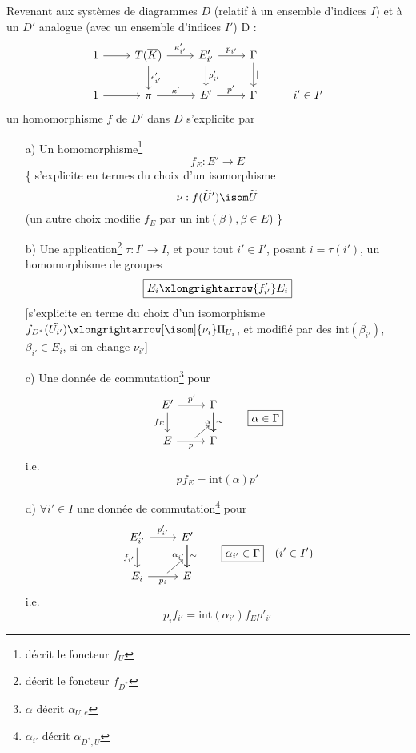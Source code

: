 Revenant aux systèmes de diagrammes $D$ (relatif à un ensemble d'indices $I$) et à un $D'$ analogue (avec un ensemble d'indices $I'$) D :
\[\begin{tikzcd}
	1 & {T(\overline{K})} & {E'_{i'}} & \Gamma \\
	1 & \pi & E' & \Gamma & i' \in I'
	\arrow[from=1-1, to=1-2]
	\arrow["{\kappa'_{i'}}", from=1-2, to=1-3]
	\arrow["{p_{i'}}", from=1-3, to=1-4]
	\arrow["\mid", from=1-4, to=2-4]
	\arrow["{\rho'_{i'}}", from=1-3, to=2-3]
	\arrow["{\epsilon'_{i'}}", from=1-2, to=2-2]
	\arrow[from=2-1, to=2-2]
	\arrow["\kappa'", from=2-2, to=2-3]
	\arrow["p'", from=2-3, to=2-4]
\end{tikzcd}
\]
un homomorphisme $f$ de $D'$ dans $D$ s'explicite par 
\begin{enumerate}
    \item[a)] Un homomorphisme\footnote{décrit le foncteur $f_U$}
    $$
    \boxed{f_E: E' \to E}
    $$
    \{ s'explicite en termes du choix d'un isomorphisme
    $$
    \nu: f(\widetilde{U}') \isom \widetilde{U}
    $$
    (un autre choix modifie $f_E$ par un $\text{int}(\beta), \beta \in E$) \}
    \item[b)] Une application\footnote{décrit le foncteur $f_{D^*}$} $\tau: I' \to I$, et pour tout $i' \in I'$, posant $i = \tau(i')$, un homomorphisme de groupes
    $$
    \boxed{E_i \xlongrightarrow{f'_{i'}} E_i}
    $$
    [s'explicite en terme du choix d'un isomorphisme $f_{D^*}(\tilde{U_{i'}}) \xlongrightarrow[\isom]{\nu_i} \Pi_{U_i}$, et modifié par des $\text{int}(\beta_{i'})$, $\beta_{i'} \in E_i$, si on change $\nu_{i'}$]
    \item[c)] Une donnée de commutation\footnote{$\alpha$ décrit $\alpha_{U, e}$} pour
    \[\begin{tikzcd}
	{E'} & \Gamma \\
	E & \Gamma
	\arrow["{f_E}"', from=1-1, to=2-1]
	\arrow["{p'}", from=1-1, to=1-2]
	\arrow[""{name=0, anchor=center, inner sep=0}, "p"', from=2-1, to=2-2]
	\arrow[""{name=1, anchor=center, inner sep=0}, "\alpha"', from=1-2, to=2-2]
	\arrow["\sim", from=1-2, to=2-2]
	\arrow[shorten <=4pt, shorten >=4pt, from=0, to=1]
    \end{tikzcd} \quad\quad \boxed{\alpha \in \Gamma}
    \]
    i.e.
    $$
    \boxed{pf_E = \text{int}(\alpha)p'}
    $$
    \item[d)] $\forall i' \in I$ une donnée de commutation\footnote{$\alpha_{i'}$ décrit $\alpha_{D^*, U}$} pour
    \[\begin{tikzcd}
	{E'_{i'}} & E' \\
	{E_i} & E
	\arrow["{f_{i'}}"', from=1-1, to=2-1]
	\arrow["{p'_{i'}}", from=1-1, to=1-2]
	\arrow[""{name=0, anchor=center, inner sep=0}, "{p_i}"', from=2-1, to=2-2]
	\arrow[""{name=1, anchor=center, inner sep=0}, "{\alpha_{i'}}"', from=1-2, to=2-2]
	\arrow["\sim", from=1-2, to=2-2]
	\arrow[shorten <=4pt, shorten >=4pt, from=0, to=1]
    \end{tikzcd} \quad\quad \boxed{\alpha_{i'} \in \Gamma} \quad (i' \in I')
    \]
    i.e.
    $$
    \boxed{p_i f_{i'} = \text{int}(\alpha_{i'})f_E \rho'_{i'}}
    $$
\end{enumerate}

